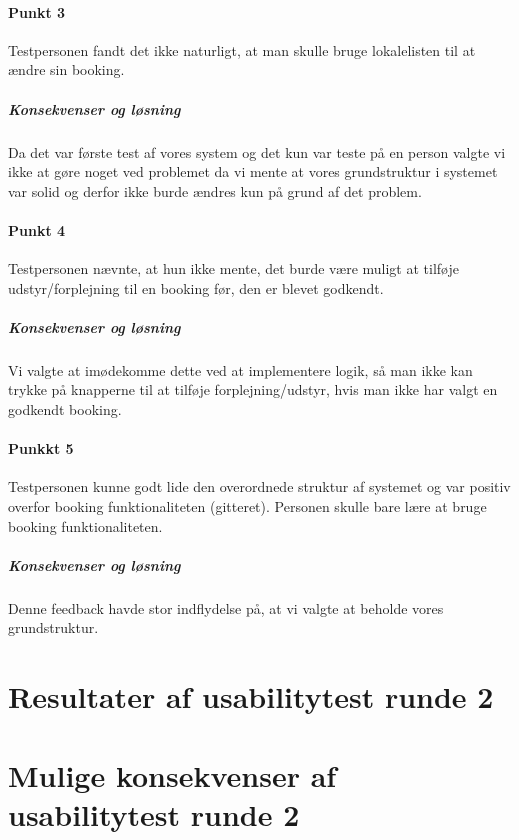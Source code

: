 \paragraph{Punkt 3}
Testpersonen fandt det ikke naturligt, at man skulle bruge lokalelisten til at ændre sin booking.
\subparagraph{Konsekvenser og løsning}
Da det var første test af vores system og det kun var teste på en person valgte vi ikke at gøre noget ved problemet da vi mente at vores grundstruktur i systemet var solid og derfor ikke burde ændres kun på grund af det problem.

\paragraph{Punkt 4}
Testpersonen nævnte, at hun ikke mente, det burde være muligt at tilføje udstyr/forplejning til en booking før, den er blevet godkendt.
\subparagraph{Konsekvenser og løsning}
Vi valgte at imødekomme dette ved at implementere logik, så man ikke kan trykke på knapperne til at tilføje forplejning/udstyr, hvis man ikke har valgt en godkendt booking.

\paragraph{Punkkt 5}
Testpersonen kunne godt lide den overordnede struktur af systemet og var positiv overfor booking funktionaliteten (gitteret). Personen skulle bare lære at bruge booking funktionaliteten.
\subparagraph{Konsekvenser og løsning}
Denne feedback havde stor indflydelse på, at vi valgte at beholde vores grundstruktur.

\section{Resultater af usabilitytest runde 2}
\label{Usability_R2}
\section{Mulige konsekvenser af usabilitytest runde 2}
\label{Usability_R2_Possibilities}